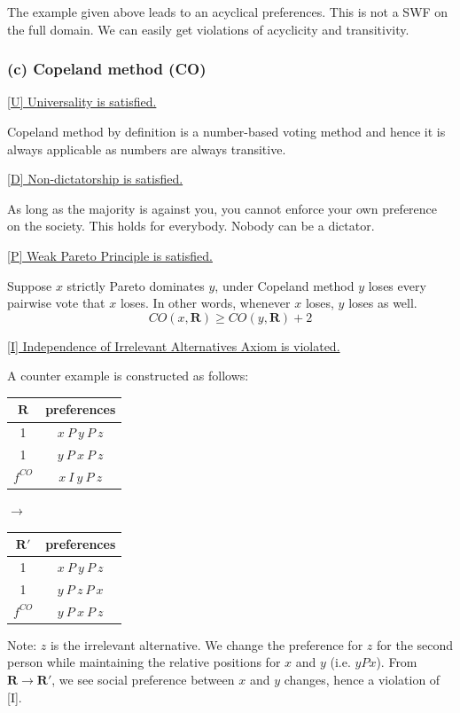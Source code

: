 \documentclass[a4paper]{article}
\begin{document}
The example given above leads to an acyclical preferences. This is not a SWF on the full domain. We can easily get violations of acyclicity and transitivity.

\subsubsection*{(c) Copeland method (CO)}

\underline{[U] Universality is satisfied.}

Copeland method by definition is a number-based voting method and hence it is always applicable as numbers are always transitive.

\underline{[D] Non-dictatorship is satisfied.} 

As long as the majority is against you, you cannot enforce your own preference on the society. This holds for everybody. Nobody can be a dictator.

\underline{[P] Weak Pareto Principle is satisfied.}

Suppose $x$ strictly Pareto dominates $y$, under Copeland method $y$ loses every pairwise vote that $x$ loses. In other words, whenever $x$ loses, $y$ loses as well. 
\[CO(x, \mathbf{R}) \geq CO(y,\mathbf{R})+2 \]

\underline{[I] Independence of Irrelevant Alternatives Axiom is violated.}

A counter example is constructed as follows:

\begin{table}[!htbp]
    \centering
    \begin{tabular}{c|c|}
        $\mathbf{R}$ & preferences         \\ 
        \hline
        1  & $x\: P\: y\: P\: z$ \\
        1  & $y\: P\: x\: P\: z$ \\
        \hline 
        $f^{CO}$ & $x\: I\: y\: P\: z$
    \end{tabular}
    \qquad $\to$ \qquad
    \centering
    \begin{tabular}{c|c|}
        $\mathbf{R'}$ & preferences         \\ 
        \hline
        1  & $x\: P\: y\: P\: z$ \\
        1  & $y\: P\: z\: P\: x$ \\
        \hline 
        $f^{CO}$ & $y\: P\: x\: P\: z$
    \end{tabular}
\end{table}

Note: $z$ is the irrelevant alternative. We change the preference for $z$ for the second person while maintaining the relative positions for $x$ and $y$ (i.e. $yPx$). From $\mathbf{R}\to\mathbf{R'}$, we see social preference between $x$ and $y$ changes, hence a violation of [I].
\end{document}
